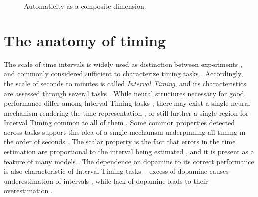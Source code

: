     \begin{figure}
        \centering
        \caption{Automaticity as a composite dimension.}
        \label{fig:automaticity}
    \end{figure}
    
    
    


\section{The anatomy of timing}
\label{sub:anatomy}
    
    The scale of time intervals is widely used as distinction between experiments \cite{van20168, buhusi2005makes, hardy2016neurocomputational}, and commonly considered sufficient to characterize timing tasks \cite{buhusi2005makes}. Accordingly, the scale of seconds to minutes is called \textit{Interval Timing}, and its characteristics are assessed through several tasks \cite{lloyd2012neural,astrand2014comparison,brea2016prospective,mello2015scalable,gouvea2015striatal,kopec2018controlling,gershman2014dopamine,tiganj2016sequential,narayanan2009delay,cho2010differential}. While neural structures necessary for good performance differ among Interval Timing tasks \cite{paton2018neural}, there may exist a single neural mechanism rendering the time representation \cite{gibbon1977scalar}, or still further a single region for Interval Timing common to all of them \cite{mello2015scalable}. Some common properties detected across tasks support this idea of a single mechanism underpinning all timing in the order of seconds \cite{buhusi2005makes, gibbon1977scalar}. The scalar property is the fact that errors in the time estimation are  proportional to the interval being estimated \cite{oprisan2014all}, and it is present as a feature of many models \cite{gibbon1977scalar, oprisan2014all}. The dependence on dopamine to its correct performance is also characteristic of Interval Timing tasks \cite{kim2017optogenetic, meck2012gene} -- excess of dopamine causes underestimation of intervals \cite{cheng2016clock, pine2010dopamine}, while lack of dopamine leads to their overestimation \cite{drew2003effects}. 
    
